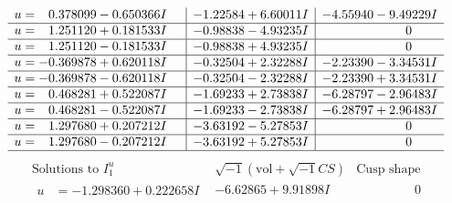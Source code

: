 \documentclass[1p]{elsarticle_modified}
\theoremstyle{definition}
\newcommand{\I}{\sqrt{-1}}
\begin{document}
$$\begin{array}{c|c|c}
\begin{aligned}
u &= \phantom{-}0.378099 - 0.650366 I\end{aligned}
 & -1.22584 + 6.60011 I & -4.55940 - 9.49229 I \\ \hline\begin{aligned}
u &= \phantom{-}1.251120 + 0.181533 I\end{aligned}
 & -0.98838 - 4.93235 I & \phantom{-0.000000 } 0 \\ \hline\begin{aligned}
u &= \phantom{-}1.251120 - 0.181533 I\end{aligned}
 & -0.98838 + 4.93235 I & \phantom{-0.000000 } 0 \\ \hline\begin{aligned}
u &= -0.369878 + 0.620118 I\end{aligned}
 & -0.32504 + 2.32288 I & -2.23390 - 3.34531 I \\ \hline\begin{aligned}
u &= -0.369878 - 0.620118 I\end{aligned}
 & -0.32504 - 2.32288 I & -2.23390 + 3.34531 I \\ \hline\begin{aligned}
u &= \phantom{-}0.468281 + 0.522087 I\end{aligned}
 & -1.69233 + 2.73838 I & -6.28797 - 2.96483 I \\ \hline\begin{aligned}
u &= \phantom{-}0.468281 - 0.522087 I\end{aligned}
 & -1.69233 - 2.73838 I & -6.28797 + 2.96483 I \\ \hline\begin{aligned}
u &= \phantom{-}1.297680 + 0.207212 I\end{aligned}
 & -3.63192 - 5.27853 I & \phantom{-0.000000 } 0 \\ \hline\begin{aligned}
u &= \phantom{-}1.297680 - 0.207212 I\end{aligned}
 & -3.63192 + 5.27853 I & \phantom{-0.000000 } 0\\
 \hline 
 \end{array}$$\newpage$$\begin{array}{c|c|c}  
\text{Solutions to }I^u_{1}& \I (\text{vol} + \sqrt{-1}CS) & \text{Cusp shape}\\
 \hline 
\begin{aligned}
u &= -1.298360 + 0.222658 I\end{aligned}
 & -6.62865 + 9.91898 I & \phantom{-0.000000 } 0 \\ \hline\begin{aligned}

\end{aligned}
\end{array}$$
\end{document}
